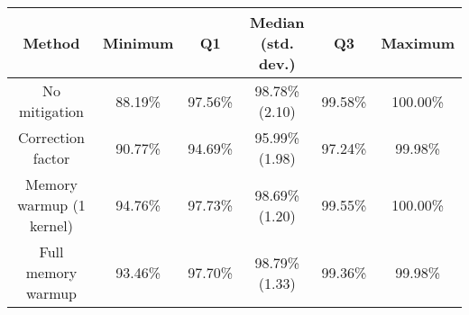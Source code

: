 \begin{tabular}{|c|c|c|c|c|c|}
    \hline
        \textbf{Method} & \textbf{Minimum} & \textbf{Q1} & \textbf{Median (std. dev.)} & \textbf{Q3} & \textbf{Maximum} \\
    \hline
    \hline
        No mitigation & 88.19\% & 97.56\% & 98.78\% (2.10) & 99.58\% & 100.00\% \\
        Correction factor & 90.77\% & 94.69\% & 95.99\% (1.98) & 97.24\% & 99.98\% \\
        Memory warmup (1 kernel) & 94.76\% & 97.73\% & 98.69\% (1.20) & 99.55\% & 100.00\% \\
        Full memory warmup & 93.46\% & 97.70\% & 98.79\% (1.33) & 99.36\% & 99.98\% \\
    \hline
\end{tabular}

